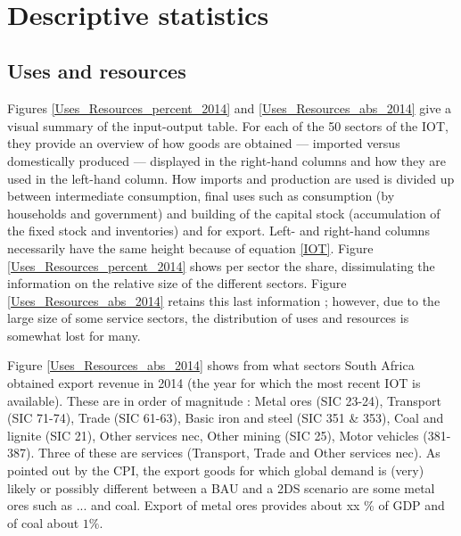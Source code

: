 \documentclass[12pt,english]{article}
\newcommand\lies[2][]{\todo[color=orange!50,#1]{ldf: #2}}
\newcommand\li[1]{\lies[inline]{#1}}
\begin{document}

\


\section{Descriptive statistics}

\subsection{Uses and resources}

Figures \ref{Uses_Resources_percent_2014} and \ref{Uses_Resources_abs_2014} give a visual summary of the input-output table. For each of the 50 sectors of the IOT, they provide an overview of how goods are obtained --- imported versus domestically produced --- displayed in the right-hand columns and how they are used in the left-hand column. How imports and production are used is divided up between intermediate consumption, final uses such as consumption (by households and government) and building of the capital stock (accumulation of the fixed stock and inventories) and for export. Left- and right-hand columns necessarily have the same height because of equation \ref{IOT}. Figure \ref{Uses_Resources_percent_2014} shows per sector the share, dissimulating the information on the relative size of the different sectors. Figure \ref{Uses_Resources_abs_2014} retains this last information ; however, due to the large size of some service sectors, the distribution of uses and resources is somewhat lost for many.  

Figure \ref{Uses_Resources_abs_2014} shows from what sectors South Africa obtained export revenue in 2014 (the year for which the most recent IOT is available). These are in order of magnitude : Metal ores (SIC 23-24), Transport (SIC 71-74), Trade (SIC 61-63), Basic iron and steel (SIC 351 \& 353), Coal and lignite (SIC 21), Other services nec, Other mining (SIC 25), Motor vehicles (381-387). Three of these are services (Transport, Trade and Other services nec). %
As pointed out by the CPI, the export goods for which global demand is (very) likely or possibly different between a BAU and a 2DS scenario are some metal ores such as ... and coal. Export of metal ores provides about xx \% of GDP and of coal about $1\%$\li{small tables}.
\end{document}
